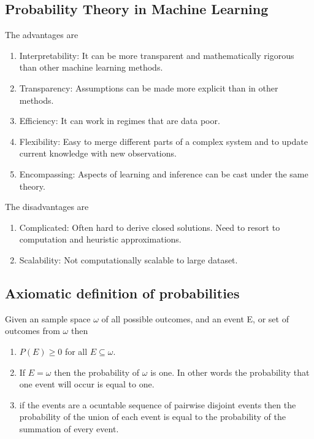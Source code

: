 \documentclass[12pt]{article}
\numberwithin{equation}{section}
\begin{document}
\subsection{Probability Theory in Machine Learning}
The advantages are
\begin{enumerate}
    \item Interpretability: It can be more transparent and mathematically rigorous than other machine learning methods.
    \item Transparency: Assumptions can be made more explicit than in other methods.
    \item Efficiency: It can work in regimes that are data poor.
    \item Flexibility: Easy to merge different parts of a complex system and to update current knowledge with new observations.
    \item Encompassing: Aspects of learning and inference can be cast under the same theory.
\end{enumerate}
The disadvantages are
\begin{enumerate}
    \item Complicated: Often hard to derive closed solutions. Need to resort to computation and heuristic approximations.
    \item Scalability: Not computationally scalable to large dataset.
\end{enumerate}
\subsection{Axiomatic definition of probabilities}
Given an sample space $\omega$ of all possible outcomes, and an event E, or set of outcomes from $\omega$ then
\begin{enumerate}
    \item $P(E) \geq 0$ for all $E \subseteq \omega$.
    \item If $E = \omega$ then the probability of $\omega$ is one. In other words the probability that one event will occur is equal to one.
    \item if the events are a ocuntable sequence of pairwise disjoint events then the probability of the union of each event is equal to the probability of the summation of every event.
\end{enumerate}
\end{document}
